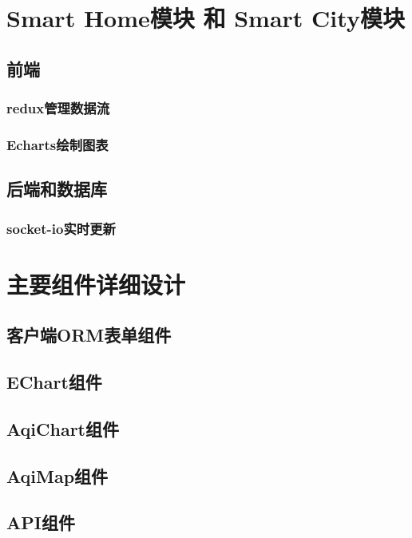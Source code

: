 \section{Smart Home模块 和 Smart City模块}
\subsection{前端}
\subsubsection{redux管理数据流}
\subsubsection{Echarts绘制图表}
\subsection{后端和数据库}
\subsubsection{socket-io实时更新}
\section{主要组件详细设计}
\subsection{客户端ORM表单组件}
\subsection{EChart组件}
\subsection{AqiChart组件}
\subsection{AqiMap组件}
\subsection{API组件}
